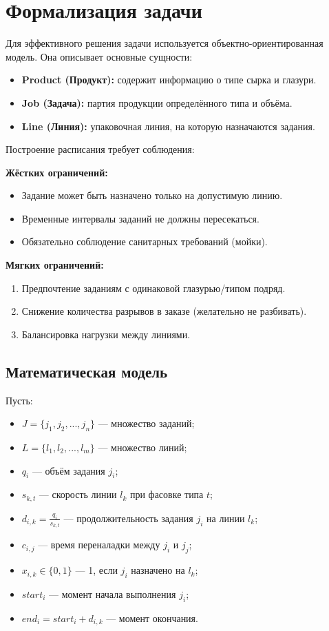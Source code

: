 \section{Формализация задачи}

Для эффективного решения задачи используется объектно-ориентированная модель. Она описывает основные сущности:

\begin{itemize}
    \item \textbf{Product (Продукт):} содержит информацию о типе сырка и глазури.
    \item \textbf{Job (Задача):} партия продукции определённого типа и объёма.
    \item \textbf{Line (Линия):} упаковочная линия, на которую назначаются задания.
\end{itemize}

Построение расписания требует соблюдения:

\textbf{Жёстких ограничений:}
\begin{itemize}
    \item Задание может быть назначено только на допустимую линию.
    \item Временные интервалы заданий не должны пересекаться.
    \item Обязательно соблюдение санитарных требований (мойки).
\end{itemize}

\textbf{Мягких ограничений:}
\begin{enumerate}
    \item Предпочтение заданиям с одинаковой глазурью/типом подряд.
    \item Снижение количества разрывов в заказе (желательно не разбивать).
    \item Балансировка нагрузки между линиями.
\end{enumerate}

\subsection{Математическая модель}

Пусть:

\begin{itemize}
    \item $J = \{j_1, j_2, ..., j_n\}$ — множество заданий;
    \item $L = \{l_1, l_2, ..., l_m\}$ — множество линий;
    \item $q_i$ — объём задания $j_i$;
    \item $s_{k,t}$ — скорость линии $l_k$ при фасовке типа $t$;
    \item $d_{i,k} = \frac{q_i}{s_{k,t}}$ — продолжительность задания $j_i$ на линии $l_k$;
    \item $c_{i,j}$ — время переналадки между $j_i$ и $j_j$;
    \item $x_{i,k} \in \{0,1\}$ — 1, если $j_i$ назначено на $l_k$;
    \item $start_i$ — момент начала выполнения $j_i$;
    \item $end_i = start_i + d_{i,k}$ — момент окончания.
\end{itemize}

